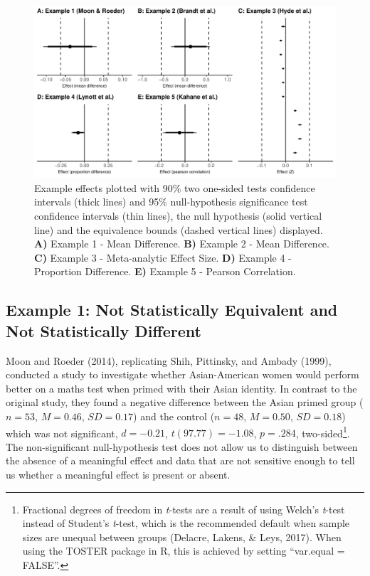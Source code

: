 \documentclass[english,floatsintext,man]{apa6}
\theoremstyle{definition}
\theoremstyle{definition}
\theoremstyle{definition}
\theoremstyle{remark}
\begin{document}
\begin{figure}
\centering
\includegraphics{Figure_2.pdf}
\caption{\label{fig:unnamed-chunk-6}Example effects plotted with 90\% two
one-sided tests confidence intervals (thick lines) and 95\%
null-hypothesis significance test confidence intervals (thin lines), the
null hypothesis (solid vertical line) and the equivalence bounds (dashed
vertical lines) displayed. \textbf{A)} Example 1 - Mean Difference.
\textbf{B)} Example 2 - Mean Difference. \textbf{C)} Example 3 -
Meta-analytic Effect Size. \textbf{D)} Example 4 - Proportion
Difference. \textbf{E)} Example 5 - Pearson Correlation.}
\end{figure}

\subsection{Example 1: Not Statistically Equivalent and Not
Statistically
Different}\label{example-1-not-statistically-equivalent-and-not-statistically-different}

Moon and Roeder (2014), replicating Shih, Pittinsky, and Ambady (1999),
conducted a study to investigate whether Asian-American women would
perform better on a maths test when primed with their Asian identity. In
contrast to the original study, they found a negative difference between
the Asian primed group (\(n = 53\), \(M = 0.46\), \(SD = 0.17\)) and the
control (\(n = 48\), \(M = 0.50\), \(SD = 0.18\)) which was not
significant, \(d = -0.21\), \(t(97.77) = -1.08\), \(p = .284\),
two-sided\footnote{Fractional degrees of freedom in \emph{t}-tests are a
  result of using Welch's \emph{t}-test instead of Student's
  \emph{t}-test, which is the recommended default when sample sizes are
  unequal between groups (Delacre, Lakens, \& Leys, 2017). When using
  the TOSTER package in R, this is achieved by setting
  \enquote{var.equal = FALSE}.}. The non-significant null-hypothesis
test does not allow us to distinguish between the absence of a
meaningful effect and data that are not sensitive enough to tell us
whether a meaningful effect is present or absent.
\end{document}

